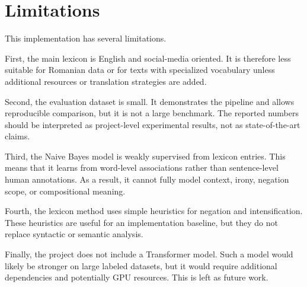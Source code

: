 \section{Limitations}

This implementation has several limitations.

First, the main lexicon is English and social-media oriented. It is therefore less suitable for Romanian data or for texts with specialized vocabulary unless additional resources or translation strategies are added.

Second, the evaluation dataset is small. It demonstrates the pipeline and allows reproducible comparison, but it is not a large benchmark. The reported numbers should be interpreted as project-level experimental results, not as state-of-the-art claims.

Third, the Naive Bayes model is weakly supervised from lexicon entries. This means that it learns from word-level associations rather than sentence-level human annotations. As a result, it cannot fully model context, irony, negation scope, or compositional meaning.

Fourth, the lexicon method uses simple heuristics for negation and intensification. These heuristics are useful for an implementation baseline, but they do not replace syntactic or semantic analysis.

Finally, the project does not include a Transformer model. Such a model would likely be stronger on large labeled datasets, but it would require additional dependencies and potentially GPU resources. This is left as future work.
